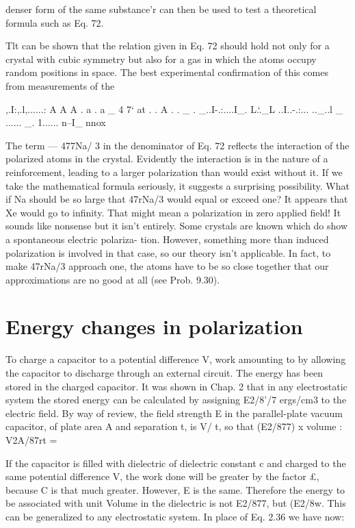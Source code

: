 {{denser form of the same substance'r can then be used to test a theoretical
formula such as Eq. 72.

Tlt can be shown that the relation given in Eq. 72 should hold not only for a crystal
with cubic symmetry but also for a gas in which the atoms occupy random positions in
space. The best experimental confirmation of this comes from measurements of the

,.I:,.l,......: A A A . a . a _ 4 7‘ at . . A . . _ . _..I-.:....I_. L.‘._L ..I..-.:... .._..l _ ...... _. 1...... n--I_ nnox

 
 

 

 

The term  --- 477Na/ 3 in the denominator of Eq. 72 reflects the interaction
of the polarized atoms in the crystal. Evidently the interaction
is in the nature of a reinforcement, leading to a larger polarization
than would exist without it. If we take the mathematical formula
seriously, it suggests a surprising possibility. What if Na should be
so large that 47rNa/3 would equal or exceed one? It appears that
Xe would go to infinity. That might mean a polarization in zero
applied field! It sounds like nonsense but it isn't entirely. Some
crystals are known which do show a spontaneous electric polariza-
tion. However, something more than induced polarization is involved
in that case, so our theory isn't applicable. In fact, to make
47rNa/3 approach one, the atoms have to be so close together that
our approximations are no good at all (see Prob. 9.30).

\section{Energy changes in polarization}

To charge a capacitor to a potential difference V, work amounting
to %
by allowing the capacitor to discharge through an external circuit.
The energy has been stored in the charged capacitor. It was shown
in Chap. 2 that in any electrostatic system the stored energy can be
calculated by assigning E2/8'/7 ergs/cm3 to the electric field. By way
of review, the field strength E in the parallel-plate vacuum capacitor,
of plate area A and separation t, is V/ t, so that (E2/877) x volume :
V2A/87rt = %

If the capacitor is filled with dielectric of dielectric constant c and
charged to the same potential difference V, the work done will be
greater by the factor £, because C is that much greater. However,
E is the same. Therefore the energy to be associated with unit
Volume in the dielectric is not E2/877, but (E2/8w. This can be generalized
to any electrostatic system. In place of Eq. 2.36 we have now:

}}
